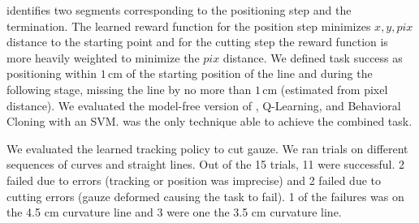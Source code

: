 \hirl identifies two segments corresponding to the positioning step and the termination.
The learned reward function for the position step minimizes $x,y,pix$ distance to the starting point and for the cutting step the reward function is more heavily weighted to minimize the $pix$ distance.
We defined task success as positioning within $1$\,cm of the starting position of the line and during the following stage, missing the line by no more than $1$\,cm (estimated from pixel distance).
We evaluated the model-free version of \hirl, Q-Learning, and Behavioral Cloning with an SVM.
\hirl was the only technique able to achieve the combined task.

We evaluated the learned tracking policy to cut gauze.
We ran trials on different sequences of curves and straight lines. 
Out of the 15 trials, 11 were successful.
2 failed due to \hirl errors (tracking or position was imprecise) and 2 failed due to cutting errors (gauze deformed causing the task to fail).
1 of the failures was on the 4.5 cm curvature line and 3 were one the 3.5 cm curvature line.




